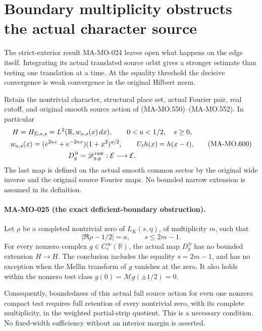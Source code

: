 \section{Boundary multiplicity obstructs the actual character source}
\label{sec:character-boundary-obstruction}

The strict-exterior result MA-MO-024 leaves open what happens
on the edge itself. Integrating its actual translated source
orbit gives a stronger estimate than testing one translation
at a time. At the equality threshold the decisive convergence
is weak convergence in the original Hilbert norm.

Retain the nontrivial character, structural place set, actual
Fourier pair, real cutoff, and original smooth source action
of (MA-MO.550)--(MA-MO.552). In particular
\[
 \begin{gathered}
 H=H_{\Sigma,a,s}=L^2(\mathbb R,w_{a,s}(x)\,dx),
       \qquad 0<a<1/2,\quad s\ge0,\\
 w_{a,s}(x)=(e^{2ax}+e^{-2ax})(1+x^2)^{s/2},\qquad
 U_th(x)=h(x-t),\\
 D_g^{\,0}=\mathscr D^{\,\rm raw}_{\eta,g}:
                         \mathcal E\longrightarrow\mathcal E .
 \end{gathered}
 \tag{MA-MO.600}
\]
The last map is defined on the actual smooth common sector
by the original wide inverse and the original source Fourier
maps. No bounded narrow extension is assumed in its definition.

\paragraph{MA-MO-025 (the exact deficient-boundary obstruction).}
Let \(\rho\) be a completed nontrivial zero of \(L_K(s,\eta)\),
of multiplicity \(m\), such that
\[
             |\Re\rho-1/2|=a,\qquad s\le 2m-1 .
 \tag{MA-MO.601}
\]
For every nonzero complex \(g\in C_c^\infty(\mathbb R)\),
the actual map \(D_g^{\,0}\) has no bounded extension
\(H\to H\). The conclusion includes the equality
\(s=2m-1\), and has no exception when the Mellin transform
of \(g\) vanishes at the zero. It also holds within the
nonzero test class \(g(0)=\mathcal Mg(\pm1/2)=0\).

Consequently, boundedness of this actual full source action
for even one nonzero compact test requires full retention
of every nontrivial zero, with its complete multiplicity,
in the weighted partial-strip quotient. This is a necessary
condition. No fixed-width sufficiency without an interior
margin is asserted.

